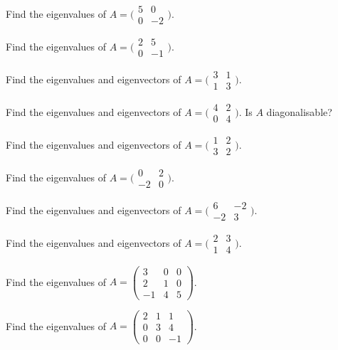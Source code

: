 \begin{problems}
  \item Find the eigenvalues of $A = \bigl(\begin{smallmatrix} 5 & 0 \\ 0 & -2 \end{smallmatrix}\bigr)$.
  \item Find the eigenvalues of $A = \bigl(\begin{smallmatrix} 2 & 5 \\ 0 & -1 \end{smallmatrix}\bigr)$.
  \item Find the eigenvalues and eigenvectors of $A = \bigl(\begin{smallmatrix} 3 & 1 \\ 1 & 3 \end{smallmatrix}\bigr)$.
  \item Find the eigenvalues and eigenvectors of $A = \bigl(\begin{smallmatrix} 4 & 2 \\ 0 & 4 \end{smallmatrix}\bigr)$. Is $A$ diagonalisable?
  \item Find the eigenvalues and eigenvectors of $A = \bigl(\begin{smallmatrix} 1 & 2 \\ 3 & 2 \end{smallmatrix}\bigr)$.
  \item Find the eigenvalues of $A = \bigl(\begin{smallmatrix} 0 & 2 \\ -2 & 0 \end{smallmatrix}\bigr)$.
  \item Find the eigenvalues and eigenvectors of $A = \bigl(\begin{smallmatrix} 6 & -2 \\ -2 & 3 \end{smallmatrix}\bigr)$.
  \item Find the eigenvalues and eigenvectors of $A = \bigl(\begin{smallmatrix} 2 & 3 \\ 1 & 4 \end{smallmatrix}\bigr)$.
  \item Find the eigenvalues of $A = \begin{pmatrix} 3 & 0 & 0 \\ 2 & 1 & 0 \\ -1 & 4 & 5 \end{pmatrix}$.
  \item Find the eigenvalues of $A = \begin{pmatrix} 2 & 1 & 1 \\ 0 & 3 & 4 \\ 0 & 0 & -1 \end{pmatrix}$.

\end{problems}
